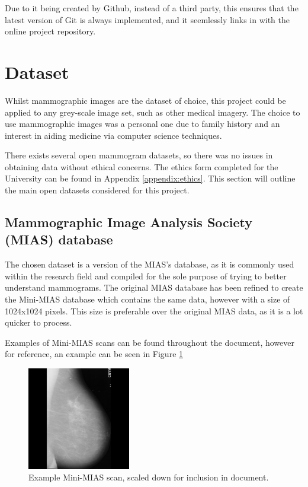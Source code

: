Due to it being created by Github, instead of a third party, this ensures that the latest version of Git is always implemented, and it seemlessly links in with the online project repository.

\section{Dataset}

Whilst mammographic images are the dataset of choice, this project could be applied to any grey-scale image set, such as other medical imagery. The choice to use mammographic images was a personal one due to family history and an interest in aiding medicine via computer science techniques.

There exists several open mammogram datasets, so there was no issues in obtaining data without ethical concerns. The ethics form completed for the University can be found in Appendix \ref{appendix:ethics}. This section will outline the main open datasets considered for this project.

\subsection{Mammographic Image Analysis Society (MIAS) database}

The chosen dataset is a version of the \acrfull{MIAS}'s database, as it is commonly used within the research field and compiled for the sole purpose of trying to better understand mammograms. The original \acrshort{MIAS} database has been refined to create the Mini-\acrshort{MIAS} database which contains the same data, however with a size of 1024x1024 pixels. This size is preferable over the original \acrshort{MIAS} data, as it is a lot quicker to process.

Examples of Mini-\acrshort{MIAS} scans can be found throughout the document, however for reference, an example can be seen in Figure \ref{fig:mini-mias}

\begin{figure}[H]
  \centering
  \includegraphics[width=0.4\textwidth]{Chapter2/tools/mias.jpg}
  \caption{Example Mini-MIAS scan, scaled down for inclusion in document.}
  \label{fig:mini-mias}
\end{figure}

